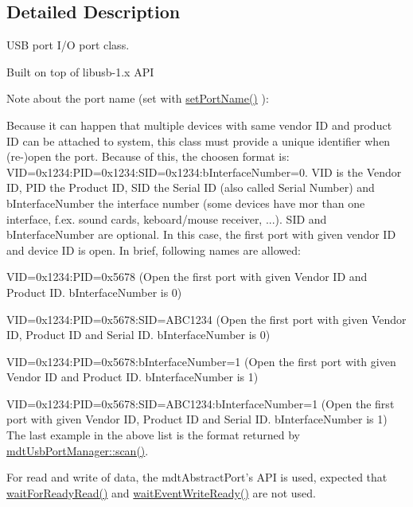 \subsection{Detailed Description}
USB port I/O port class. 

Built on top of libusb-\/1.x API

Note about the port name (set with \hyperlink{classmdt_abstract_port_a0ca143d32fc677bac7c1cf0e04144932}{setPortName()} ):\par
 Because it can happen that multiple devices with same vendor ID and product ID can be attached to system, this class must provide a unique identifier when (re-\/)open the port. Because of this, the choosen format is: VID=0x1234:PID=0x1234:SID=0x1234:bInterfaceNumber=0. VID is the Vendor ID, PID the Product ID, SID the Serial ID (also called Serial Number) and bInterfaceNumber the interface number (some devices have mor than one interface, f.ex. sound cards, keboard/mouse receiver, ...). SID and bInterfaceNumber are optional. In this case, the first port with given vendor ID and device ID is open. In brief, following names are allowed:
\begin{DoxyItemize}
\item VID=0x1234:PID=0x5678 (Open the first port with given Vendor ID and Product ID. bInterfaceNumber is 0)
\item VID=0x1234:PID=0x5678:SID=ABC1234 (Open the first port with given Vendor ID, Product ID and Serial ID. bInterfaceNumber is 0)
\item VID=0x1234:PID=0x5678:bInterfaceNumber=1 (Open the first port with given Vendor ID and Product ID. bInterfaceNumber is 1)
\item VID=0x1234:PID=0x5678:SID=ABC1234:bInterfaceNumber=1 (Open the first port with given Vendor ID, Product ID and Serial ID. bInterfaceNumber is 1) The last example in the above list is the format returned by \hyperlink{classmdt_usb_port_manager_a3a2370c3a2d0353a880bf9b777728c3b}{mdtUsbPortManager::scan()}.
\end{DoxyItemize}

For read and write of data, the mdtAbstractPort's API is used, expected that \hyperlink{classmdt_usb_port_ab8ddd4ebee603ac381e8da0383a61e36}{waitForReadyRead()} and \hyperlink{classmdt_usb_port_a3be875f6f10ae94fd3a94f925bb935e7}{waitEventWriteReady()} are not used.

